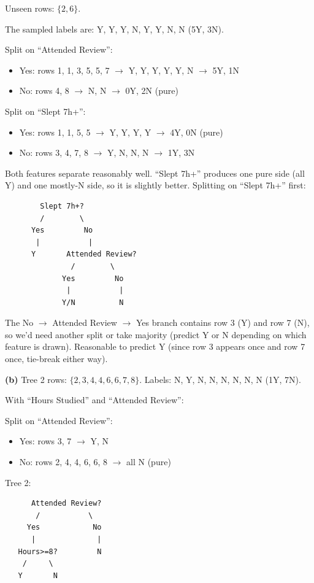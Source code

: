 \documentclass[11pt,a4paper]{article}
\begin{document}
Unseen rows: $\{2, 6\}$.

The sampled labels are: Y, Y, Y, N, Y, Y, N, N (5Y, 3N).

Split on ``Attended Review'':
\begin{itemize}
\item Yes: rows 1, 1, 3, 5, 5, 7 $\to$ Y, Y, Y, Y, Y, N $\to$ 5Y, 1N
\item No: rows 4, 8 $\to$ N, N $\to$ 0Y, 2N (pure)
\end{itemize}

Split on ``Slept 7h+'':
\begin{itemize}
\item Yes: rows 1, 1, 5, 5 $\to$ Y, Y, Y, Y $\to$ 4Y, 0N (pure)
\item No: rows 3, 4, 7, 8 $\to$ Y, N, N, N $\to$ 1Y, 3N
\end{itemize}

Both features separate reasonably well. ``Slept 7h+'' produces one pure side (all Y) and one mostly-N side, so it is slightly better. Splitting on ``Slept 7h+'' first:

\begin{verbatim}
        Slept 7h+?
        /        \
      Yes         No
       |           |
      Y       Attended Review?
               /        \
             Yes         No
              |           |
             Y/N          N
\end{verbatim}

The No $\to$ Attended Review $\to$ Yes branch contains row 3 (Y) and row 7 (N), so we'd need another split or take majority (predict Y or N depending on which feature is drawn). Reasonable to predict Y (since row 3 appears once and row 7 once, tie-break either way).

\medskip
\textbf{(b)} Tree 2 rows: $\{2, 3, 4, 4, 6, 6, 7, 8\}$. Labels: N, Y, N, N, N, N, N, N (1Y, 7N).

With ``Hours Studied'' and ``Attended Review'':

Split on ``Attended Review'':
\begin{itemize}
\item Yes: rows 3, 7 $\to$ Y, N
\item No: rows 2, 4, 4, 6, 6, 8 $\to$ all N (pure)
\end{itemize}

Tree 2:
\begin{verbatim}
      Attended Review?
       /           \
     Yes            No
      |              |
   Hours>=8?         N
    /     \
   Y       N
\end{verbatim}
\end{document}
